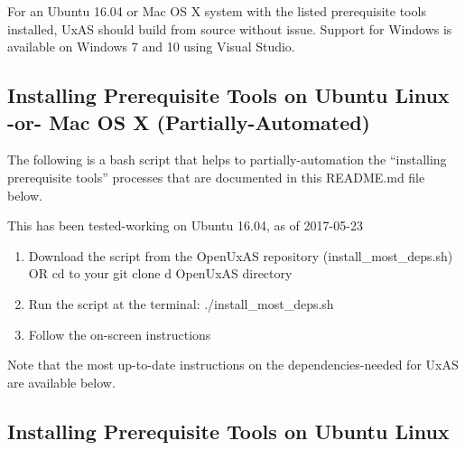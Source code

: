 For an Ubuntu 16.04 or Mac OS X system with the listed prerequisite
tools installed, UxAS should build from source without issue. Support
for Windows is available on Windows 7 and 10 using Visual Studio.

\subsection{Installing Prerequisite Tools on Ubuntu Linux -or- Mac OS X
(Partially-Automated)}\label{installing-prerequisite-tools-on-ubuntu-linux--or--mac-os-x-partially-automated}

The following is a bash script that helps to partially-automation the
``installing prerequisite tools'' processes that are documented in this
README.md file below.

This has been tested-working on Ubuntu 16.04, as of 2017-05-23

\begin{enumerate}
\def\labelenumi{\arabic{enumi}.}
\item
  Download the script from the OpenUxAS repository
  (install\_most\_deps.sh) OR cd to your git clone d OpenUxAS directory
\item
  Run the script at the terminal: ./install\_most\_deps.sh
\item
  Follow the on-screen instructions
\end{enumerate}

Note that the most up-to-date instructions on the dependencies-needed
for UxAS are available below.

\subsection{Installing Prerequisite Tools on Ubuntu
Linux}\label{installing-prerequisite-tools-on-ubuntu-linux}


